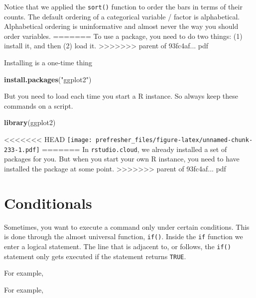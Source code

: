 \documentclass[]{book}
\newenvironment{Shaded}{\begin{snugshade}}{\end{snugshade}}
\newcommand{\KeywordTok}[1]{\textcolor[rgb]{0.13,0.29,0.53}{\textbf{#1}}}
\newcommand{\NormalTok}[1]{#1}
\newcommand{\StringTok}[1]{\textcolor[rgb]{0.31,0.60,0.02}{#1}}
\theoremstyle{definition}
\theoremstyle{definition}
\theoremstyle{definition}
\theoremstyle{remark}
\begin{document}
\begin{Shaded}
\begin{Highlighting}[]
\begin{Shaded}
\begin{Highlighting}[]
\begin{Shaded}
\begin{Highlighting}[]
Notice that we applied the \texttt{sort()} function to order the bars in terms of their counts. The default ordering of a categorical variable / factor is alphabetical. Alphabetical ordering is uninformative and almost never the way you should order variables.
=======
To use a package, you need to do two things: (1) install it, and then (2) load it.
>>>>>>> parent of 93fc4af... pdf

Installing is a one-time thing

\begin{Shaded}
\begin{Highlighting}[]
\KeywordTok{install.packages}\NormalTok{(}\StringTok{"ggplot2"}\NormalTok{)}
\end{Highlighting}
\end{Shaded}

But you need to load each time you start a R instance. So always keep these commands on a script.

\begin{Shaded}
\begin{Highlighting}[]
\KeywordTok{library}\NormalTok{(ggplot2)}
\end{Highlighting}
\end{Shaded}

<<<<<<< HEAD
\texttt{[image: prefresher\_files/figure-latex/unnamed-chunk-233-1.pdf]}
=======
In \texttt{rstudio.cloud}, we already installed a set of packages for you. But when you start your own R instance, you need to have installed the package at some point.
>>>>>>> parent of 93fc4af... pdf

\hypertarget{conditionals}{%
\section{Conditionals}\label{conditionals}}

Sometimes, you want to execute a command only under certain conditions. This is done through the almost universal function, \texttt{if()}. Inside the \texttt{if} function we enter a logical statement. The line that is adjacent to, or follows, the \texttt{if()} statement only gets executed if the statement returns \texttt{TRUE}.

For example,

For example,


\end{Highlighting}
\end{Shaded}
\end{Highlighting}
\end{Shaded}
\end{Highlighting}
\end{Shaded}
\end{document}

